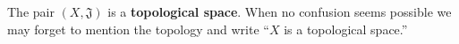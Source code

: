 The pair $(X, \mathfrak{J})$ is a \textbf{topological space}. When no confusion seems possible we may forget to mention the topology and write ``$X$ is a topological space.''
